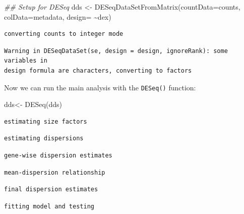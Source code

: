 \documentclass[
  letterpaper,
  DIV=11,
  numbers=noendperiod]{scrartcl}
\newenvironment{Shaded}{\begin{snugshade}}{\end{snugshade}}
\newcommand{\AttributeTok}[1]{\textcolor[rgb]{0.40,0.45,0.13}{#1}}
\newcommand{\DocumentationTok}[1]{\textcolor[rgb]{0.37,0.37,0.37}{\textit{#1}}}
\newcommand{\FunctionTok}[1]{\textcolor[rgb]{0.28,0.35,0.67}{#1}}
\newcommand{\NormalTok}[1]{\textcolor[rgb]{0.00,0.23,0.31}{#1}}
\newcommand{\OtherTok}[1]{\textcolor[rgb]{0.00,0.23,0.31}{#1}}
\newcommand{\SpecialCharTok}[1]{\textcolor[rgb]{0.37,0.37,0.37}{#1}}
\begin{document}
\begin{Shaded}
\begin{Highlighting}[]
\DocumentationTok{\#\# Setup for DESeq}
\NormalTok{dds }\OtherTok{\textless{}{-}} \FunctionTok{DESeqDataSetFromMatrix}\NormalTok{(}\AttributeTok{countData=}\NormalTok{counts,}
                              \AttributeTok{colData=}\NormalTok{metadata,}
                              \AttributeTok{design=} \SpecialCharTok{\textasciitilde{}}\NormalTok{dex)}
\end{Highlighting}
\end{Shaded}

\begin{verbatim}
converting counts to integer mode
\end{verbatim}

\begin{verbatim}
Warning in DESeqDataSet(se, design = design, ignoreRank): some variables in
design formula are characters, converting to factors
\end{verbatim}

Now we can run the main analysis with the \texttt{DESeq()} function:

\begin{Shaded}
\begin{Highlighting}[]
\NormalTok{dds}\OtherTok{\textless{}{-}} \FunctionTok{DESeq}\NormalTok{(dds)}
\end{Highlighting}
\end{Shaded}

\begin{verbatim}
estimating size factors
\end{verbatim}

\begin{verbatim}
estimating dispersions
\end{verbatim}

\begin{verbatim}
gene-wise dispersion estimates
\end{verbatim}

\begin{verbatim}
mean-dispersion relationship
\end{verbatim}

\begin{verbatim}
final dispersion estimates
\end{verbatim}

\begin{verbatim}
fitting model and testing
\end{verbatim}
\end{document}
